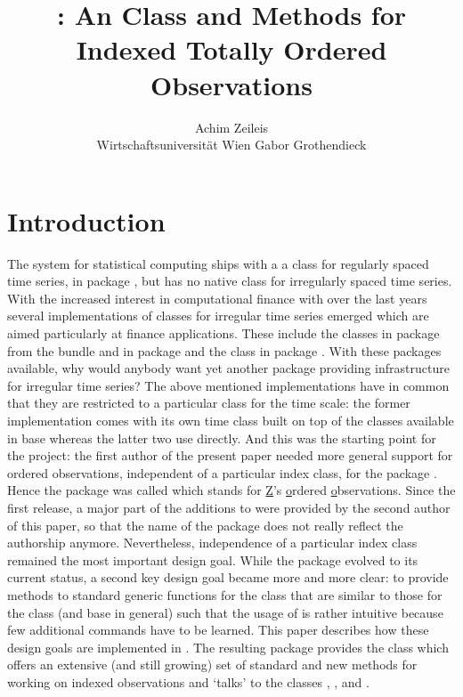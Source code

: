 \documentclass{Z}
\author{Achim Zeileis\\Wirtschaftsuniversit\"at Wien \And
        Gabor Grothendieck}
\title{\pkg{zoo}: An \proglang{S3} Class and Methods for
  Indexed Totally Ordered Observations}
\begin{document}



\section{Introduction} \label{sec:intro}

The  system for statistical computing
\citep[\url{http://www.R-project.org/}]{zoo:R:2004}
ships with a a class for regularly spaced time series,
 in package , but has no native class for
irregularly spaced time series. With the increased interest in
computational finance with  over the last years
several implementations of classes for irregular time series 
emerged which are aimed particularly at finance applications.
These include the  classes 
in package  from the  bundle \citep{zoo:fBasics:2004}
and  in package  \citep{zoo:tseries:2004}
and the  class  in package  \citep{zoo:its:2004}.
With these packages available, why would anybody want yet another 
package providing infrastructure for irregular time series?
The above mentioned implementations have in common that they are restricted to a particular
class for the time scale: the former implementation comes with its own time class
 built on top of the  classes
available in base  whereas the latter two use  directly.
And this was the starting point for the  project: the first author
of the present paper needed
more general support for ordered observations, independent of a particular
index class, for the package 
\citep{zoo:Zeileis+Leisch+Hornik:2002}. Hence the package was called
 which stands for \underline{Z}'s \underline{o}rdered \underline{o}bservations.
Since the first release, a major part of the additions to 
were provided by the second author of this paper, so that the name
of the package does not really reflect the authorship anymore.
Nevertheless, independence of a particular index class remained
the most important design goal. While the package evolved to its current
status, a second key design goal became more and more clear: to provide
methods to standard generic functions for the  class that 
are similar to those for the  class (and base  in
general) such that the usage of  is rather intuitive because
few additional commands have to be learned.
This paper describes how these design goals are implemented in .
The resulting package provides the  class which offers an
extensive (and still growing) set of standard and new methods for working
on indexed observations and `talks' to the classes , ,
 and .
\end{document}
